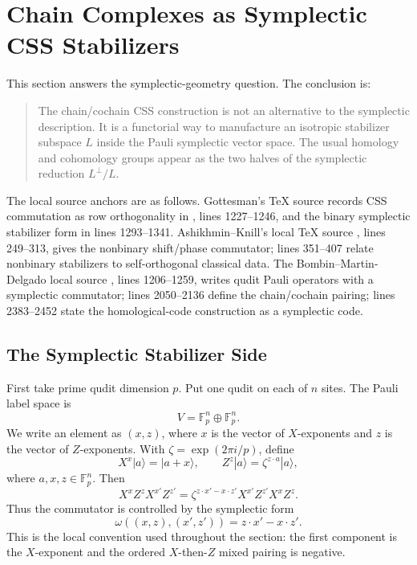 
\section{Chain Complexes as Symplectic CSS Stabilizers}
\label{sec:symplectic-css-bridge}

This section answers the symplectic-geometry question. The conclusion is:

\begin{quote}
The chain/cochain CSS construction is not an alternative to the symplectic
description. It is a functorial way to manufacture an isotropic stabilizer
subspace \(L\) inside the Pauli symplectic vector space. The usual homology and
cohomology groups appear as the two halves of the symplectic reduction
\(L^\perp/L\).
\end{quote}

The local source anchors are as follows. Gottesman's TeX source records CSS
commutation as row orthogonality in
,
lines 1227--1246, and the binary symplectic stabilizer form in lines
1293--1341. Ashikhmin--Knill's local TeX source
,
lines 249--313, gives the nonbinary shift/phase commutator; lines 351--407
relate nonbinary stabilizers to self-orthogonal classical data. The
Bombin--Martin-Delgado local source
,
lines 1206--1259, writes qudit Pauli operators with a symplectic commutator;
lines 2050--2136 define the chain/cochain pairing; lines 2383--2452 state the
homological-code construction as a symplectic code.

\subsection{The Symplectic Stabilizer Side}

First take prime qudit dimension \(p\). Put one qudit on each of \(n\) sites.
The Pauli label space is
\[
  V=\mathbb F_p^n\oplus\mathbb F_p^n .
\]
We write an element as \((x,z)\), where \(x\) is the vector of \(X\)-exponents
and \(z\) is the vector of \(Z\)-exponents. With
\(\zeta=\exp(2\pi i/p)\), define
\[
  X^x|a\rangle=|a+x\rangle,\qquad
  Z^z|a\rangle=\zeta^{z\cdot a}|a\rangle ,
\]
where \(a,x,z\in\mathbb F_p^n\). Then
\[
  X^xZ^zX^{x'}Z^{z'}
  =
  \zeta^{z\cdot x'-x\cdot z'}X^{x'}Z^{z'}X^xZ^z .
\]
Thus the commutator is controlled by the symplectic form
\[
  \omega((x,z),(x',z'))=z\cdot x'-x\cdot z' .
\]
This is the local convention used throughout the section: the first component
is the \(X\)-exponent and the ordered \(X\)-then-\(Z\) mixed pairing is negative.


